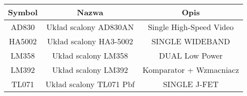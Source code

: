 \begin{table}[htbp]
\label{tab:tabelka}
\begin{tabular}{|c|c|c|}
\hline
Symbol & Nazwa                   & Opis                    \\ \hline
AD830  & Układ scalony AD830AN   & Single High-Speed Video \\ \hline
HA5002 & Układ scalony HA3-5002  & SINGLE WIDEBAND         \\ \hline
LM358  & Układ scalony LM358     & DUAL Low Power          \\ \hline
LM392  & Układ scalony LM392     & Komparator + Wzmacniacz \\ \hline
TL071  & Układ scalony TL071 Pbf & SINGLE J-FET            \\ \hline
\end{tabular}
\end{table}